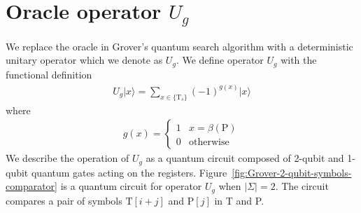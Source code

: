 \section{Oracle operator $U_{g}$}
We replace the oracle in Grover's quantum search algorithm with a deterministic unitary operator which we denote as $U_{g}$. We define operator $U_{g}$ with the functional definition
\begin{align*}
	U_{g}\vert x \rangle = \sum_{x \in \{\text{T}_{s}\}} (-1)^{g(x)} \vert x \rangle
\end{align*} 
where
\begin{align*}
	g(x) =
	\begin{cases}
		1 & x = \beta(\text{P})\\
		0 & \text{otherwise}
	\end{cases}
\end{align*}
We describe the operation of $U_{g}$ as a quantum circuit composed of 2-qubit and 1-qubit quantum gates acting on the registers. Figure~\ref{fig:Grover-2-qubit-symbols-comparator} is a quantum circuit for operator $U_{g}$ when $\vert \Sigma \vert = 2$. The circuit compares a pair of symbols $\text{T}[i+j]$ and $\text{P}[j]$ in T and P. 
